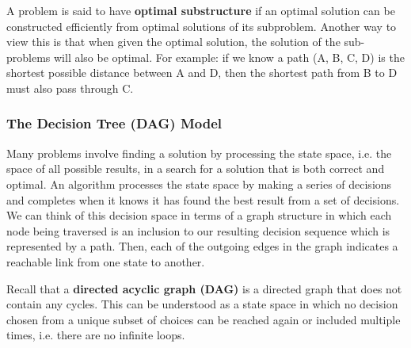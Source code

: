 \documentclass{article}
\begin{document}
    A problem is said to have \textbf{optimal substructure} if an optimal solution can be constructed efficiently from optimal solutions of its subproblem. Another way to view this is that when given the optimal solution, the solution of the sub-problems will also be optimal. For example: if we know a path (A, B, C, D) is the shortest possible distance between A and D, then the shortest path from B to D must also pass through C.
    
   \subsubsection{The Decision Tree (DAG) Model}
    Many problems involve finding a solution by processing the state space, i.e. the space of all possible results, in a search for a solution that is both correct and optimal. An algorithm processes the state space by making a series of decisions and completes when it knows it has found the best result from a set of decisions. We can think of this decision space in terms of a graph structure in which each node being traversed is an inclusion to our resulting decision sequence which is represented by a path. Then, each of the outgoing edges in the graph indicates a reachable link from one state to another. 
    
    Recall that a \textbf{directed acyclic graph (DAG)} is a directed graph that does not contain any cycles. This can be understood as a state space in which no decision chosen from a unique subset of choices can be reached again or included multiple times, i.e. there are no infinite loops.
    
\end{document}
